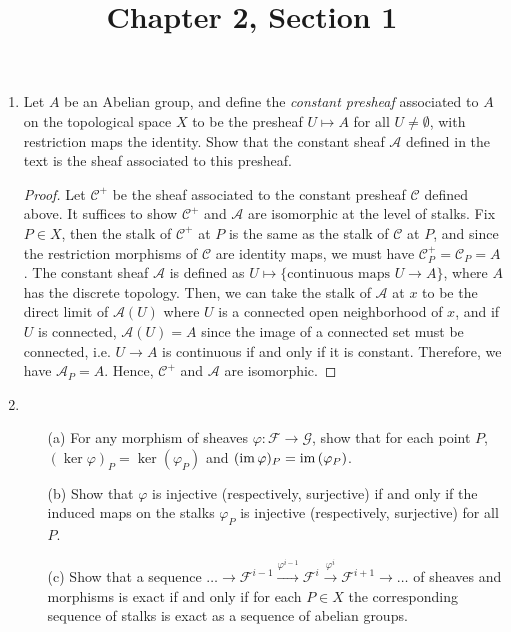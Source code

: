 \documentclass{article}
\title{Chapter 2, Section 1}
\begin{document}
\maketitle
\begin{enumerate} [label=\textbf{\arabic*.}, leftmargin=0em]

\item Let $A$ be an Abelian group, and define the \textit{constant presheaf} associated to $A$ on the topological space $X$ to be the presheaf $U \mapsto A$ for all $U \neq \emptyset$, with restriction maps the identity. Show that the constant sheaf $\mathscr{A}$ defined in the text is the sheaf associated to this presheaf.

\begin{proof}
    Let $\mathscr{C}^+$ be the sheaf associated to the constant presheaf $\mathscr{C}$ defined above.
    It suffices to show $\mathscr{C}^+$ and $\mathscr{A}$ are isomorphic at the level of stalks.
    Fix $P \in X$, then the stalk of $\mathscr{C}^+$ at $P$ is the same as the stalk of $\mathscr{C}$ at $P$, and since the restriction morphisms of $\mathscr{C}$ are identity maps, we must have $\mathscr{C}^+_P = \mathscr{C}_P = A$.
    The constant sheaf $\mathscr{A}$ is defined as $U \mapsto \{ \text{continuous maps $U \to A$}\}$, where $A$ has the discrete topology.
    Then, we can take the stalk of $\mathscr{A}$ at $x$ to be the direct limit of $\mathscr{A}(U)$ where $U$ is a connected open neighborhood of $x$, and if $U$ is connected, $\mathscr{A}(U) = A$ since the image of a connected set must be connected, i.e. $U \to A$ is continuous if and only if it is constant.
    Therefore, we have $\mathscr{A}_P = A$. Hence, $\mathscr{C}^+$ and $\mathscr{A}$ are isomorphic.
\end{proof}

\item \begin{itemize}
    \item[(a)] For any morphism of sheaves $\varphi : \mathscr{F} \to \mathscr{G}$, show that for each point $P$, $(\ker{\varphi})_P = \ker{(\varphi_P)}$ and $(\operatorname{im}{\varphi})_P = \operatorname{im}{(\varphi_P)}$.
    \item[(b)] Show that $\varphi$ is injective (respectively, surjective) if and only if the induced maps on the stalks $\varphi_P$ is injective (respectively, surjective) for all $P$.
    \item[(c)] Show that a sequence $\dots \to \mathscr{F}^{i - 1} \xrightarrow{\varphi^{i - 1}} \mathscr{F}^i \xrightarrow{\varphi^i} \mathscr{F}^{i + 1} \to \dots$ of sheaves and morphisms is exact if and only if for each $P \in X$ the corresponding sequence of stalks is exact as a sequence of abelian groups.
\end{itemize}


\end{enumerate}
\end{document}
